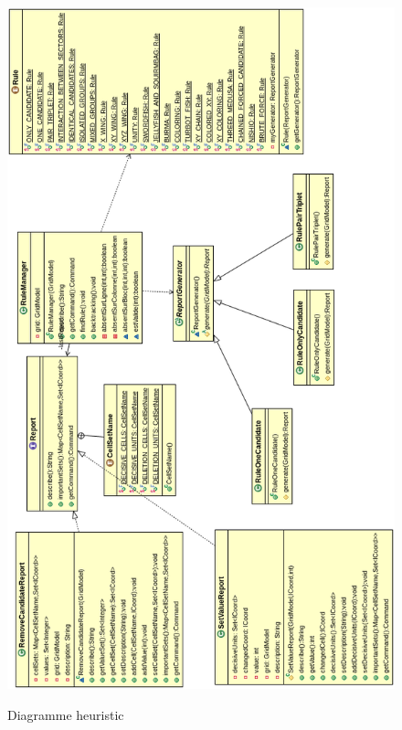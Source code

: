 \begin{figure}[ht]
  \caption{\label{annexe9} Diagramme heuristic}
  \includegraphics [width=140mm]{images/heuristic.png} \\[0.5cm]
\end{figure}

